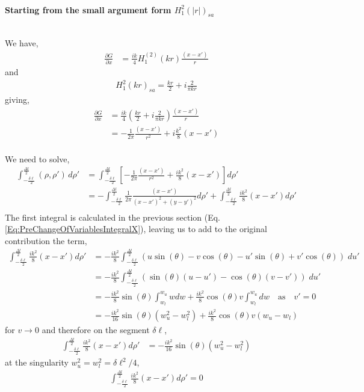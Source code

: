 \documentclass{article}
\newcommand{\0}{\varnothing}
\begin{document}
{\ \\ \centering \bf Starting from the small argument form $H_1^2(|r|)_{sa}$\ \\\ \\}

 We have,
\begin{align*}
    \frac{\partial G}{\partial x} &= \frac{ik}{4}  H_{1}^{(2)}(kr) \frac{(x-x')}{r}
\end{align*}
and
\begin{align*}
        H_1^2(kr)_{sa} = \frac{kr}{2} + i  \frac{2}{\pi kr}
\end{align*}
giving, 
\begin{align*}
    \frac{\partial G}{\partial x} &= \frac{ik}{4} \left( \frac{kr}{2} + i  \frac{2}{\pi kr} \right) \frac{(x-x')}{r}\\
    &=   - \frac{1}{2 \pi } \frac{(x-x')}{r^2} + i\frac{k^2}{8}(x-x')\\
\end{align*}

We need to solve,
\begin{align*}
    \int_{-\frac{\delta \ell}{2}}^{\frac{\Delta l}{2}} (\rho,\rho')\, d\rho' &= 
    \int_{-\frac{\delta \ell}{2}}^{\frac{\Delta l}{2}} \left[ -\frac{1}{2 \pi } \frac{(x-x')}{r^2} + \frac{ik^2}{8}(x-x') \right] d\rho'\\
    &=   -\int_{-\frac{\delta \ell}{2}}^{\frac{\Delta l}{2}} \frac{1}{2 \pi } \frac{(x-x')}{(x-x')^2+(y-y')^2} d\rho' + \int_{-\frac{\delta \ell}{2}}^{\frac{\Delta l}{2}} \frac{ik^2}{8}(x-x')  d\rho'\\
\end{align*}
The first integral is calculated in the previous section (Eq. \eqref{Eq:PreChangeOfVariablesIntegralX}), leaving us to add to the original contribution the term,
\begin{align*}
    \int_{-\frac{\delta \ell}{2}}^{\frac{\Delta l}{2}} \frac{ik^2}{8}(x-x')  d\rho' 
    &= -\frac{ik^2}{8} \int_{-\frac{\delta \ell}{2}}^{\frac{\Delta l}{2}} \left( u\sin(\theta) - v\cos(\theta) 
                                  - u'\sin(\theta) + v'\cos(\theta) \right) \; du'\\
    &= -\frac{ik^2}{8} \int_{-\frac{\delta \ell}{2}}^{\frac{\Delta l}{2}} \left( \sin(\theta)(u-u') - \cos(\theta)(v-v') \right) \; du'\\    
    &= -\frac{ik^2}{8} \sin(\theta)\int_{w_l}^{w_u}  w dw + \frac{ik^2}{8} \cos(\theta)v \int_{w_l}^{w_u} dw \quad \text{as} \quad v' = 0 \\
    &= -\frac{ik^2}{16} \sin(\theta) \left( w_u^2 - w^2_l \right) + \frac{ik^2}{8} \cos(\theta)v (w_u-w_l)
\end{align*}
for $v \rightarrow 0$ and therefore on the segment $\delta \ell$,
\begin{align*}
    \int_{-\frac{\delta \ell}{2}}^{\frac{\Delta l}{2}} \frac{ik^2}{8}(x-x')  d\rho'  &= -\frac{ik^2}{16} \sin(\theta) \left( w_u^2 - w^2_l \right)
\end{align*}
at the singularity $w^2_u = w^2_l = \delta \ell^2/4$,
\begin{align*}
    \int_{-\frac{\delta \ell}{2}}^{\frac{\Delta l}{2}} \frac{ik^2}{8}(x-x')  d\rho' = 0
\end{align*}
\end{document}
